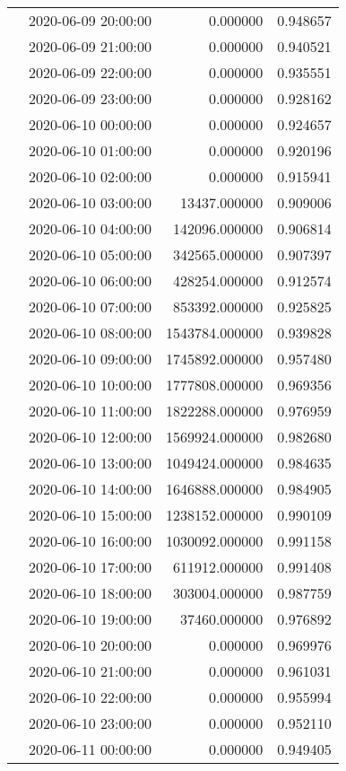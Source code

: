 \begin{tabular}{llrr}
 & 2020-06-09 20:00:00 & 0.000000 & 0.948657 \\
 & 2020-06-09 21:00:00 & 0.000000 & 0.940521 \\
 & 2020-06-09 22:00:00 & 0.000000 & 0.935551 \\
 & 2020-06-09 23:00:00 & 0.000000 & 0.928162 \\
 & 2020-06-10 00:00:00 & 0.000000 & 0.924657 \\
 & 2020-06-10 01:00:00 & 0.000000 & 0.920196 \\
 & 2020-06-10 02:00:00 & 0.000000 & 0.915941 \\
 & 2020-06-10 03:00:00 & 13437.000000 & 0.909006 \\
 & 2020-06-10 04:00:00 & 142096.000000 & 0.906814 \\
 & 2020-06-10 05:00:00 & 342565.000000 & 0.907397 \\
 & 2020-06-10 06:00:00 & 428254.000000 & 0.912574 \\
 & 2020-06-10 07:00:00 & 853392.000000 & 0.925825 \\
 & 2020-06-10 08:00:00 & 1543784.000000 & 0.939828 \\
 & 2020-06-10 09:00:00 & 1745892.000000 & 0.957480 \\
 & 2020-06-10 10:00:00 & 1777808.000000 & 0.969356 \\
 & 2020-06-10 11:00:00 & 1822288.000000 & 0.976959 \\
 & 2020-06-10 12:00:00 & 1569924.000000 & 0.982680 \\
 & 2020-06-10 13:00:00 & 1049424.000000 & 0.984635 \\
 & 2020-06-10 14:00:00 & 1646888.000000 & 0.984905 \\
 & 2020-06-10 15:00:00 & 1238152.000000 & 0.990109 \\
 & 2020-06-10 16:00:00 & 1030092.000000 & 0.991158 \\
 & 2020-06-10 17:00:00 & 611912.000000 & 0.991408 \\
 & 2020-06-10 18:00:00 & 303004.000000 & 0.987759 \\
 & 2020-06-10 19:00:00 & 37460.000000 & 0.976892 \\
 & 2020-06-10 20:00:00 & 0.000000 & 0.969976 \\
 & 2020-06-10 21:00:00 & 0.000000 & 0.961031 \\
 & 2020-06-10 22:00:00 & 0.000000 & 0.955994 \\
 & 2020-06-10 23:00:00 & 0.000000 & 0.952110 \\
 & 2020-06-11 00:00:00 & 0.000000 & 0.949405 \\

\end{tabular}
